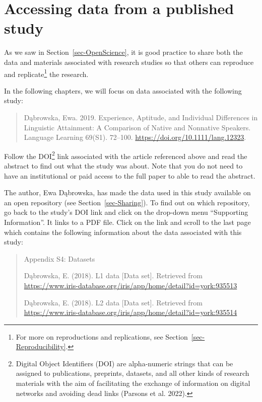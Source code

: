 \documentclass[
  letterpaper,
  DIV=11,
  numbers=noendperiod]{scrreprt}
\begin{document}
\section{Accessing data from a published study}\label{sec-AccessingData}

As we saw in Section~\ref{sec-OpenScience}, it is good practice to share
both the data and materials associated with research studies so that
others can reproduce and replicate\footnote{For more on reproductions
  and replications, see Section~\ref{sec-Reproducibility}.} the
research.

In the following chapters, we will focus on data associated with the
following study:

\begin{quote}
Dąbrowska, Ewa. 2019. Experience, Aptitude, and Individual Differences
in Linguistic Attainment: A Comparison of Native and Nonnative Speakers.
Language Learning 69(S1). 72--100.
\url{https://doi.org/10.1111/lang.12323}.
\end{quote}

Follow the DOI\footnote{Digital Object Identifiers (DOI) are
  alpha-numeric strings that can be assigned to publications, preprints,
  datasets, and all other kinds of research materials with the aim of
  facilitating the exchange of information on digital networks and
  avoiding dead links ({Parsons et al.} 2022).} link associated with the
article referenced above and read the abstract to find out what the
study was about. Note that you do not need to have an institutional or
paid access to the full paper to able to read the abstract.

The author, Ewa Dąbrowska, has made the data used in this study
available on an open repository (see Section~\ref{sec-Sharing}). To find
out on which repository, go back to the study's DOI link and click on
the drop-down menu ``Supporting Information''. It links to a PDF file.
Click on the link and scroll to the last page which contains the
following information about the data associated with this study:

\begin{quote}
Appendix S4: Datasets

Dąbrowska, E. (2018). L1 data {[}Data set{]}. Retrieved from
\href{https://www.iris-database.org/details/9pplf-S7kw3}{https://www.iris-database.org/iris/app/home/detail?id=york:935513}

Dąbrowska, E. (2018). L2 data {[}Data set{]}. Retrieved from
\href{https://www.iris-database.org/details/L8w1U-ZDgnH}{https://www.iris-database.org/iris/app/home/detail?id=york:935514}
\end{quote}
\end{document}
